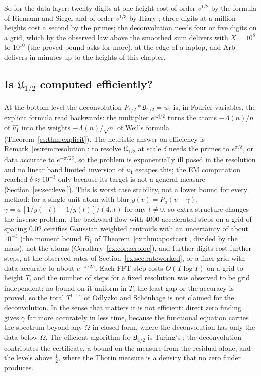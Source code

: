 So for the data layer: twenty digits at one height cost of order $v^{1/2}$ by the formula of Riemann and Siegel \cite{Edwards,Siegel32} and of order $v^{1/3}$ by Hiary \cite{Hiary11}; three digits at a million heights cost a second by the primes; the deconvolution needs four or five digits on a grid, which by the observed law above the smoothed sum delivers with $X=10^8$ to $10^{10}$ (the proved bound asks for more), at the edge of a laptop, and Arb delivers in minutes up to the heights of this chapter.

\subsection{Is $\mathfrak U_{1/2}$ computed efficiently?}\label{cx:sec:halfeff}

At the bottom level the deconvolution $P_{1/2}*\mathfrak U_{1/2}=u_1$ is, in Fourier variables, the explicit formula read backwards: the multiplier $e^{|\omega|/2}$ turns the atoms $-\Lambda(n)/n$ of $\widehat{u_1}$ into the weights $-\Lambda(n)/\sqrt n$ of Weil's formula (Theorem~\ref{es:thm:explicit}). The heuristic answer on efficiency is Remark~\ref{es:rem:resolution}: to resolve $\mathfrak U_{1/2}$ at scale $\delta$ needs the primes to $e^{\pi/\delta}$, or data accurate to $e^{-\pi/2\delta}$, so the problem is exponentially ill posed in the resolution and no linear band limited inversion of $u_1$ escapes this; the EM computation reached $\delta\approx10^{-3}$ only because its target is not a general measure (Section~\ref{es:sec:level}). This is worst case stability, not a lower bound for every method: for a single unit atom with blur $y(v)=P_a(v-\gamma)$, $\gamma=a\,[1/y(-t)-1/y(t)]/(4\pi t)$ for any $t\ne0$, so extra structure changes the inverse problem. The backward flow with $4000$ accelerated steps on a grid of spacing $0.02$ certifies Gaussian weighted centroids with an uncertainty of about $10^{-3}$ (the moment bound $B_1$ of Theorem~\ref{cx:thm:apostcert}, divided by the mass), not the atoms (Corollary~\ref{cx:cor:zeroloc}), and further digits cost further steps, at the observed rates of Section~\ref{cx:sec:rateworked}, or a finer grid with data accurate to about $e^{-\pi/2h}$. Each FFT step costs $O(T\log T)$ on a grid to height $T$, and the number of steps for a fixed resolution was observed to be grid independent; no bound on it uniform in $T$, the least gap or the accuracy is proved, so the total $T^{1+\varepsilon}$ of Odlyzko and Sch\"onhage \cite{OdlyzkoSchonhage88} is not claimed for the deconvolution. In the sense that matters it is not efficient: direct zero finding gives $\gamma$ far more accurately in less time, because the functional equation carries the spectrum beyond any $\Omega$ in closed form, where the deconvolution has only the data below $\Omega$. The efficient algorithm for $\mathfrak U_{1/2}$ is Turing's \cite{Turing53}; the deconvolution contributes the certificate, a bound on the measure from the residual alone, and the levels above $\tfrac12$, where the Thorin measure is a density that no zero finder produces.

